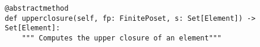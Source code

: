 \begin{verbatim}
@abstractmethod
def upperclosure(self, fp: FinitePoset, s: Set[Element]) -> Set[Element]:
    """ Computes the upper closure of an element"""
\end{verbatim}